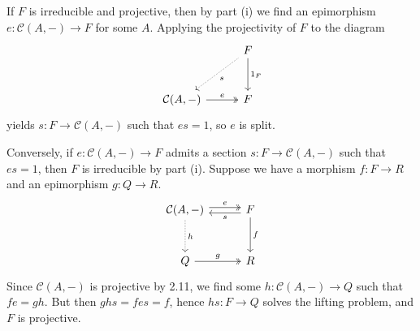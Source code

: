 If $F$ is irreducible and projective, then by part (i) we find an epimorphism
$e\colon \mathcal{C}(A, {-})\to F$ for some $A$. Applying the projectivity of
 $F$ to the diagram
\[\begin{tikzcd}[row sep=1cm, column sep=1cm]
	& F\ar[d, "1_F"]\ar[dl, densely dotted, "s"]\\
	\mathcal{C}(A, {-})\ar[r, two heads, "e"] & F
\end{tikzcd}\]
yields $s\colon F\to \mathcal{C}(A, {-})$ such that $es = 1$, so $e$ is split.

Conversely, if $e\colon \mathcal{C}(A, {-}) \to F$ admits a section
$s\colon F\to \mathcal{C}(A, {-})$ such that $es = 1$, then $F$ is irreducible by
part (i). Suppose we have a morphism  $f\colon F\to R$ and an epimorphism
$g\colon Q\to R$.
\[\begin{tikzcd}[row sep=1cm, column sep=1cm]
	\mathcal{C}(A, {-})\ar[r, shift left, "e", two heads]\ar[d, densely dotted, "h"] & F\ar[l, shift left, "s"]\ar[d, "f"]\\
	Q\ar[r, two heads, "g"] & R
\end{tikzcd}\]
Since $\mathcal{C}(A, {-})$ is projective by 2.11, we find some $h\colon \mathcal{C}(A, {-}) \to Q$ such
that $fe = gh$. But then $ghs = fes = f$, hence $hs\colon F\to Q$ solves the lifting
problem, and $F$ is projective.

